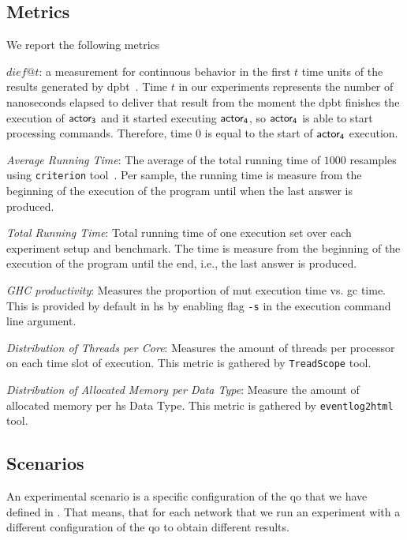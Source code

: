 \subsection{Metrics}\label{sub:metric}
We report the following metrics \begin{inparaenum}[\bf a\upshape)]
      \item {\bf $dief@t$}: a measurement for continuous behavior in the first $t$ time units of the results generated by \acrshort{dpbt}~\cite{diefpaper}. Time $t$ in our experiments represents the number of nanoseconds elapsed to deliver that result from the moment the \acrshort{dpbt} finishes the execution of $\mathsf{actor_3}$ and it started executing $\mathsf{actor_4}$, so $\mathsf{actor_4}$ is able to start processing commands. 
      Therefore, time $0$ is equal to the start of $\mathsf{actor_4}$ execution.
      \item \emph{Average Running Time}: The average of the total running time of $1000$ resamples using \texttt{criterion} tool~\cite{criterion}. Per sample, the running time is measure from the beginning of the execution of the program until when the last answer is produced.
      \item \emph{Total Running Time}: Total running time of one execution set over each experiment setup and benchmark. The time is measure from the beginning of the execution of the program until the end, i.e., the last answer is produced.
      \item \emph{GHC productivity}: Measures the proportion of \acrfull{mut} execution time vs. \acrfull{gc} time. This is provided by default in \acrshort{hs} by enabling flag \texttt{-s} in the execution command line argument.
      \item \emph{Distribution of Threads per Core}: Measures the amount of threads per processor on each time slot of execution. This metric is gathered by \texttt{TreadScope} \cite{threadscope} tool.
      \item \emph{Distribution of Allocated Memory per Data Type}: Measure the amount of allocated memory per \acrshort{hs} Data Type. This metric is gathered by \texttt{eventlog2html} \cite{eventlog2html} tool.
  \end{inparaenum}
    
\subsection{Scenarios}\label{sub:exp:exp-data-setup}
An experimental scenario is a specific configuration of the \acrfull{qo} that we have defined in . 
That means, that for each network that we run an experiment with a different configuration of the \acrshort{qo} to obtain different results.

